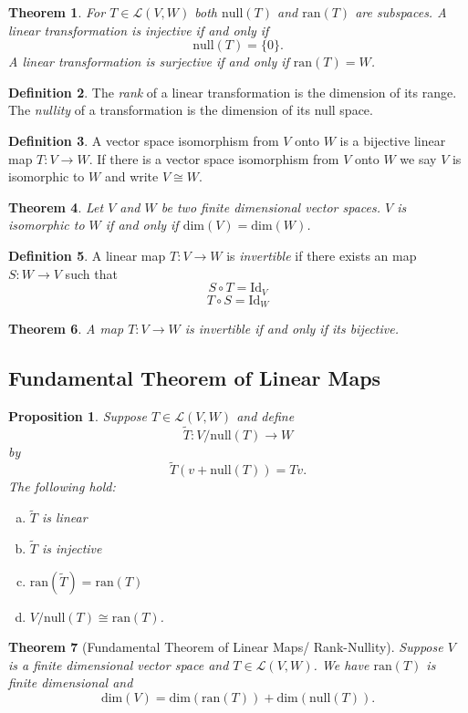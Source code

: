 \documentclass[12pt,letterpaper]{article}
\theoremstyle{plain}
\newtheorem{theorem}{Theorem}[section]
\newtheorem{proposition}{Proposition}[section]
\theoremstyle{definition}
\newtheorem{definition}[theorem]{Definition}
\numberwithin{equation}{section}
\begin{document}
\begin{theorem} For $T\in \mathcal{L}(V,W)$ both $\text{null}(T)$ and $\text{ran}(T)$ are subspaces. A linear transformation is injective if and only if 
\[\text{null}(T)=\{0\}.\]
A linear transformation is surjective if and only if $\text{ran}(T)=W$. 
\end{theorem}
\begin{definition} The \emph{rank} of a linear transformation is the dimension of its range. The \emph{nullity} of a transformation is the dimension of its null space. 
\end{definition}

\begin{definition} A vector space isomorphism from $V$ onto $W$ is a bijective linear map $T:V\rightarrow W$. If there is a vector space isomorphism from $V$ onto $W$ we say $V$ is isomorphic to $W$ and write $V\cong W$. 
\end{definition}
\begin{theorem} Let $V$ and $W$ be two finite dimensional vector spaces. $V$ is isomorphic to $W$ if and only if $\text{dim}(V)=\text{dim}(W)$.
\end{theorem}
\begin{definition} A linear map $T:V\rightarrow W$ is \emph{invertible} if there exists an map $S:W\rightarrow V$ such that 
\[S\circ T=\text{Id}_{V}\]
\[T\circ S=\text{Id}_{W}\]
\end{definition}
\begin{theorem} A map $T:V\rightarrow W$ is invertible if and only if its bijective. 
\end{theorem}
\subsection{Fundamental Theorem of Linear Maps}
\begin{proposition} Suppose $T\in \mathcal{L}(V,W)$ and define 
\[\tilde{T}:V/\text{null}(T)\rightarrow W\] 
by
\[\tilde{T}(v+\text{null}(T))=Tv.\]
The following hold:
\begin{enumerate}[a)]
\item $\tilde{T}$ is linear
\item $\tilde{T}$ is injective
\item $\text{ran}(\tilde{T})=\text{ran}(T)$
\item $V/\text{null}(T)\cong \text{ran}(T)$.
\end{enumerate}

\end{proposition}
\begin{theorem}[Fundamental Theorem of Linear Maps/ Rank-Nullity]
Suppose $V$ is a finite dimensional vector space and $T\in \mathcal{L}(V,W)$. We have $\text{ran}(T)$ is finite dimensional and 
\[\text{dim}(V)=\text{dim}(\text{ran}(T))+\text{dim}(\text{null}(T)).\]
\end{theorem}
\end{document}
